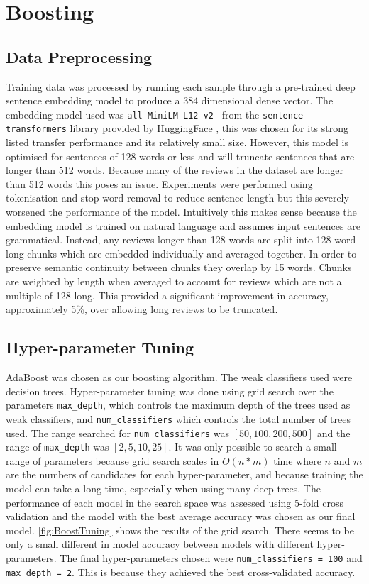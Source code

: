 \section{Boosting}
\subsection{Data Preprocessing}
Training data was processed by running each sample through a pre-trained deep sentence embedding model to produce a 384 dimensional dense vector. The embedding model used was \verb|all-MiniLM-L12-v2 | from the \verb|sentence-transformers| library provided by HuggingFace \cite{HuggingFace}, this was chosen for its strong listed transfer performance and its relatively small size. However, this model is optimised for sentences of 128 words or less and will truncate sentences that are longer than 512 words. Because many of the reviews in the dataset are longer than 512 words this poses an issue. Experiments were performed using tokenisation and stop word removal to reduce sentence length but this severely worsened the performance of the model. Intuitively this makes sense because the embedding model is trained on natural language and assumes input sentences are grammatical. Instead, any reviews longer than 128 words are split into 128 word long chunks which are embedded individually and averaged together. In order to preserve semantic continuity between chunks they overlap by 15 words. Chunks are weighted by length when averaged to account for reviews which are not a multiple of 128 long. This provided a significant improvement in accuracy, approximately 5\%,  over allowing long reviews to be truncated.

\subsection{Hyper-parameter Tuning}
AdaBoost was chosen as our boosting algorithm. The weak classifiers used were decision trees. Hyper-parameter tuning was done using grid search over the parameters \verb|max_depth|, which controls the maximum depth of the trees used as weak classifiers, and \verb|num_classifiers| which controls the total number of trees used. The range searched for \verb|num_classifiers| was $[50, 100, 200, 500]$ and the range of \verb|max_depth| was $[2, 5, 10, 25]$. It was only possible to search a small range of parameters because grid search scales in $O(n*m)$ time where $n$ and $m$ are the numbers of candidates for each hyper-parameter, and because training the model can take a long time, especially when using many deep trees. The performance of each model in the search space was assessed using 5-fold cross validation and the model with the best average accuracy was chosen as our final model. \autoref{fig:BoostTuning} shows the results of the grid search. There seems to be only a small different in model accuracy between models with different hyper-parameters. The final hyper-parameters chosen were \verb|num_classifiers = 100| and \verb|max_depth = 2|. This is because they achieved the best cross-validated accuracy. 

